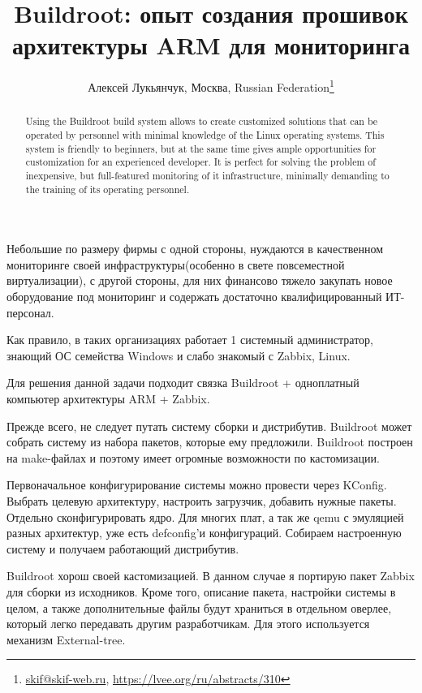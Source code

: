 \documentclass[10pt, a5paper]{article}
\begin{document}
\title{Buildroot: опыт создания прошивок архитектуры ARM для мониторинга}
\author{Алексей Лукьянчук, Москва, Russian Federation\footnote{\url{skif@skif-web.ru}, \url {https://lvee.org/ru/abstracts/310}}}
\maketitle
\begin{abstract}
Using the Buildroot build system allows to create customized solutions that can be operated by personnel with minimal know\-ledge of the Linux operating systems. This system is friendly to beginners, but at the same time gives ample opportunities for customization for an experienced developer. It is perfect for solving the problem of inexpensive, but full-featured monitoring of it infrastructure, minimally demanding to the training of its operating personnel.
\end{abstract}
Небольшие по размеру фирмы с одной стороны, нуждаются в качественном мониторинге своей инфраструктуры(особенно в свете повсеместной виртуализации), с другой стороны, для них финансово тяжело закупать новое оборудование под мониторинг и содержать достаточно квалифицированный ИТ-персонал. 

Как правило, в таких организациях работает 1 системный администратор, знающий ОС семейства Windows и слабо знакомый с Zabbix, Linux.

Для решения данной задачи подходит связка Buildroot + одноплатный компьютер архитектуры  ARM + Zabbix.

Прежде всего, не следует путать систему сборки и дистрибутив. Buildroot может собрать систему из набора пакетов, которые ему предложили. Buildroot построен на make-файлах и поэтому имеет огромные возможности по кастомизации. 

Первоначальное конфигурирование системы можно провести через KConfig. Выбрать целевую архитектуру, настроить загрузчик, добавить нужные пакеты. Отдельно сконфигурировать ядро. Для многих плат, а так же qemu с эмуляцией разных архитектур, уже есть defconfig’и конфигураций. Собираем настроенную систему и получаем работающий дистрибутив.

Buildroot хорош своей кастомизацией. В данном случае я портирую пакет Zabbix для сборки из исходников. Кроме того, описание пакета, настройки системы в целом, а также дополнительные файлы будут храниться в отдельном оверлее, который легко передавать другим разработчикам. Для этого используется механизм External-tree.
\end{document}
